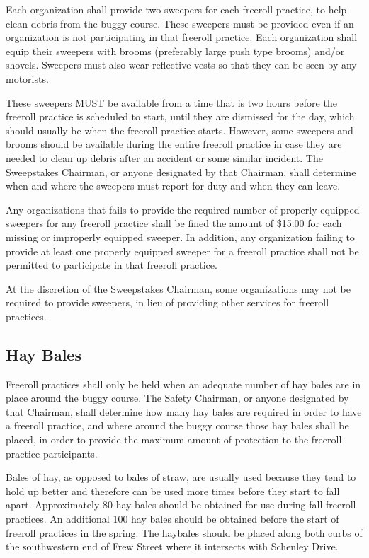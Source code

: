 	Each organization shall provide two sweepers for each freeroll practice, to
	help clean debris from the buggy course. These sweepers must be provided even
	if an organization is not participating in that freeroll practice. Each
	organization shall equip their sweepers with brooms (preferably large push type
	brooms) and/or shovels. Sweepers must also wear reflective vests so that they
	can be seen by any motorists.

	These sweepers MUST be available from a time that is two hours before the
	freeroll practice is scheduled to start, until they are dismissed for the day,
	which should usually be when the freeroll practice starts. However, some
	sweepers and brooms should be available during the entire freeroll practice in
	case they are needed to clean up debris after an accident or some similar
	incident. The Sweepstakes Chairman, or anyone designated by that Chairman,
	shall determine when and where the sweepers must report for duty and when they
	can leave.

	Any organizations that fails to provide the required number of properly
	equipped sweepers for any freeroll practice shall be fined the amount of
	\$15.00 for each missing or improperly equipped sweeper. In addition, any
	organization failing to provide at least one properly equipped sweeper for a
	freeroll practice shall not be permitted to participate in that freeroll
	practice.

	At the discretion of the Sweepstakes Chairman, some organizations may not be
	required to provide sweepers, in lieu of providing other services for freeroll
	practices.

\subsection{Hay Bales}

	Freeroll practices shall only be held when an adequate number of hay bales are
	in place around the buggy course. The Safety Chairman, or anyone designated by
	that Chairman, shall determine how many hay bales are required in order to have
	a freeroll practice, and where around the buggy course those hay bales shall be
	placed, in order to provide the maximum amount of protection to the freeroll
	practice participants.

	Bales of hay, as opposed to bales of straw, are usually used because they tend
	to hold up better and therefore can be used more times before they start to
	fall apart. Approximately 80 hay bales should be obtained for use during fall
	freeroll practices. An additional 100 hay bales should be obtained before the
	start of freeroll practices in the spring. The haybales should be placed along
	both curbs of the southwestern end of Frew Street where it intersects with
	Schenley Drive.

